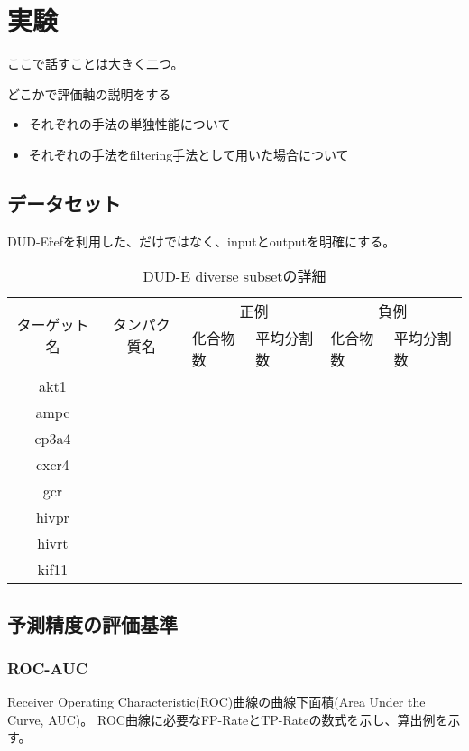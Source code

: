\chapter{実験}

ここで話すことは大きく二つ。

どこかで評価軸の説明をする
\begin{itemize}
\item それぞれの手法の単独性能について
\item それぞれの手法をfiltering手法として用いた場合について
\end{itemize}
\section{データセット}
DUD-E\r{ref}を利用した、だけではなく、inputとoutputを明確にする。
\begin{table}[htb] \centering
	\caption{DUD-E diverse subsetの詳細}
	\label{tb:dude_divset}
	\begin{tabular}{c|c|ll|ll|}
	\multirow{2}{*}{ターゲット名}	&\multirow{2}{*}{タンパク質名}	&\multicolumn{2}{c}{正例}	&\multicolumn{2}{c}{負例}	\\
							&							&化合物数	&平均分割数	&化合物数	&平均分割数	\\ \hline
	akt1						&							&			&			&			&			\\
	ampc					&							&			&			&			&			\\
	cp3a4					&							&			&			&			&			\\
	cxcr4					&							&			&			&			&			\\
	gcr						&							&			&			&			&			\\
	hivpr					&							&			&			&			&			\\
	hivrt						&							&			&			&			&			\\
	kif11						&							&			&			&			&			\\ \hline
	\end{tabular}
\end{table}
\section{予測精度の評価基準}
\subsection{ROC-AUC}
Receiver Operating Characteristic(ROC)曲線の曲線下面積(Area Under the Curve, AUC)。
ROC曲線に必要なFP-RateとTP-Rateの数式を示し、算出例を示す。
